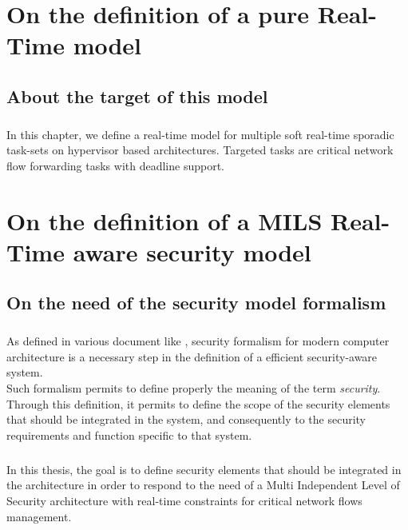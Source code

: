 
\chapter{On the definition of a pure Real-Time model}

\section{About the target of this model}

\paragraph{}
In this chapter, we define a real-time model for multiple soft real-time sporadic task-sets on
hypervisor based architectures. Targeted tasks are critical network flow forwarding tasks with
deadline support.

\chapter{On the definition of a MILS Real-Time aware security model}

\section{On the need of the security model formalism}

\paragraph{}
As defined in various document like \cite{formalsec}, security formalism for modern computer
architecture is a necessary step in the definition of a efficient security-aware system.\\
Such formalism permits to define properly the meaning of the term {\it security}. Through this
definition, it permits to define the scope of the security elements that should be integrated in
the system, and consequently to the security requirements and function specific to that system.

\paragraph{}
In this thesis, the goal is to define security elements that should be integrated in the
architecture in order to respond to the need of a Multi Independent Level of Security architecture
with real-time constraints for critical network flows management.

